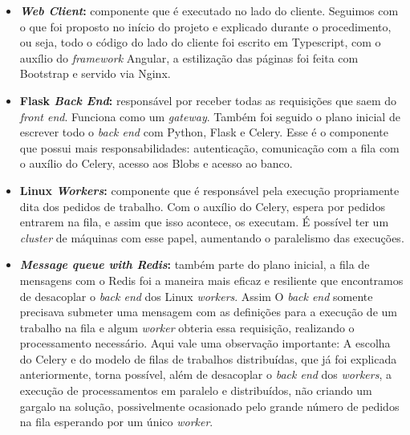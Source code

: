 \documentclass[11pt,twoside]{article}
\begin{document}
\begin{itemize}
  \item \textbf{\emph{Web Client}:} componente que é executado no lado do cliente. Seguimos com o que foi proposto no início do projeto e explicado durante o procedimento, ou seja, todo o código do lado do cliente 
  foi escrito em Typescript, com o auxílio do \emph{framework} Angular, a estilização das páginas foi feita com Bootstrap e servido via Nginx.
  \item \textbf{Flask \emph{Back End}:} responsável por receber todas as requisições que saem do \emph{front end}. Funciona como um \emph{gateway}. Também foi seguido o plano inicial de escrever todo o \emph{back end} com
  Python, Flask e Celery. Esse é o componente que possui mais responsabilidades: autenticação, comunicação com a fila com o auxílio do Celery, acesso aos Blobs e acesso ao banco.
  \item \textbf{Linux \emph{Workers}:} componente que é responsável pela execução propriamente dita dos pedidos de trabalho. Com o auxílio do Celery, espera por pedidos entrarem na fila, e assim que isso acontece, os executam. 
  É possível ter um \emph{cluster} de máquinas com esse papel, aumentando o paralelismo das execuções.
  \item \textbf{\emph{Message queue with Redis}:} também parte do plano inicial, a fila de mensagens com o Redis foi a maneira mais eficaz e resiliente que encontramos de desacoplar o \emph{back end} dos Linux \emph{workers}. Assim
  O \emph{back end} somente precisava submeter uma mensagem com as definições para a execução de um trabalho na fila e algum \emph{worker} obteria essa requisição, realizando o processamento necessário. Aqui vale uma observação 
  importante: A escolha do Celery e do modelo de filas de trabalhos distribuídas, que já foi explicada anteriormente, torna possível, além de desacoplar o \emph{back end} dos \emph{workers}, a execução de
  processamentos em paralelo e distribuídos, não criando um gargalo na solução, possivelmente ocasionado pelo grande número de pedidos na fila esperando por um único \emph{worker}.
  

\end{itemize}
\end{document}
